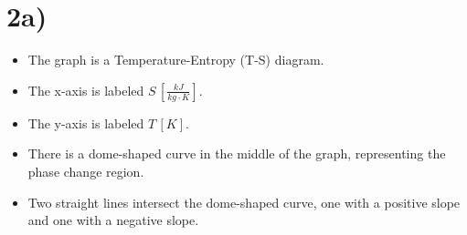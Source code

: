 

\section*{2a)}

\begin{itemize}
    \item The graph is a Temperature-Entropy (T-S) diagram.
    \item The x-axis is labeled $S \, [\frac{kJ}{kg \cdot K}]$.
    \item The y-axis is labeled $T \, [K]$.
    \item There is a dome-shaped curve in the middle of the graph, representing the phase change region.
    \item Two straight lines intersect the dome-shaped curve, one with a positive slope and one with a negative slope.
\end{itemize}